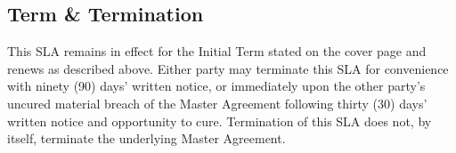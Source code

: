 \subsection{Term \& Termination}

This SLA remains in effect for the Initial Term stated on the cover page and renews as
described above. Either party may terminate this SLA for convenience with ninety (90)
days' written notice, or immediately upon the other party's uncured material breach of
the Master Agreement following thirty (30) days' written notice and opportunity to cure.
Termination of this SLA does not, by itself, terminate the underlying Master Agreement.

